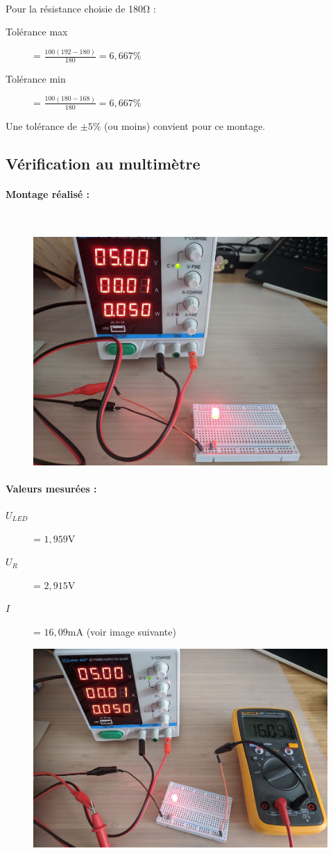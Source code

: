 \documentclass{article}
\begin{document}
\paragraph{}
Pour la résistance choisie de 180\si{\ohm} :
\begin{description}
    \item[Tolérance max] = $\frac{100(192 - 180)}{180} = 6,667\%$ 
    \item[Tolérance min] = $\frac{100(180 - 168)}{180} = 6,667\%$ 
\end{description}
Une tolérance de $\pm5\%$ (ou moins) convient pour ce montage.

\subsection{Vérification au multimètre}
\paragraph{Montage réalisé :}\
\begin{figure}[H]
    \centering
    \includegraphics[width=.6\linewidth]{images/labo1-montage.jpg}
\end{figure}

\paragraph{Valeurs mesurées :}
\begin{description}
    \item[$U_{LED}$] = $1,959 \si{\volt}$ 
    \item[$U_{R}$] = $2,915 \si{\volt}$ 
    \item[$I$] = $16,09 \si{\milli\ampere}$ (voir image suivante)
\end{description}

\begin{figure}[H]
    \centering
    \includegraphics[width=.6\linewidth]{images/labo1-courant.jpg}
\end{figure}
\end{document}

